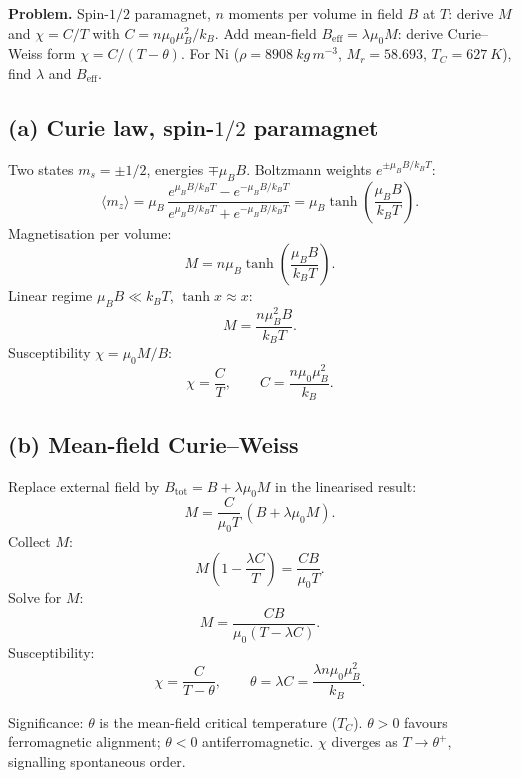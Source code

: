 \documentclass[11pt]{article}
\begin{document}
\textbf{Problem.} Spin-$1/2$ paramagnet, $n$ moments per volume in field $B$ at $T$: derive $M$ and $\chi=C/T$ with $C=n\mu_{0}\mu_{B}^{2}/k_{B}$. Add mean-field $B_\text{eff}=\lambda\mu_{0}M$: derive Curie--Weiss form $\chi=C/(T-\theta)$. For Ni ($\rho=\SI{8908}{kg\,m^{-3}}$, $M_r=58.693$, $T_C=\SI{627}{K}$), find $\lambda$ and $B_\text{eff}$.

\subsection*{(a) Curie law, spin-$1/2$ paramagnet}

Two states $m_{s}=\pm 1/2$, energies $\mp \mu_{B}B$. Boltzmann weights $e^{\pm\mu_{B}B/k_{B}T}$:
\[ \langle m_{z}\rangle = \mu_{B}\,\frac{e^{\mu_{B}B/k_{B}T}-e^{-\mu_{B}B/k_{B}T}}{e^{\mu_{B}B/k_{B}T}+e^{-\mu_{B}B/k_{B}T}} = \mu_{B}\tanh\!\left(\frac{\mu_{B}B}{k_{B}T}\right). \]
Magnetisation per volume:
\[ M = n\mu_{B}\tanh\!\left(\frac{\mu_{B}B}{k_{B}T}\right).\label{eq:Mfull} \]
Linear regime $\mu_{B}B\ll k_{B}T$, $\tanh x\approx x$:
\[ M = \frac{n\mu_{B}^{2}B}{k_{B}T}. \]
Susceptibility $\chi=\mu_{0}M/B$:
\[ \boxed{\;\chi = \frac{C}{T},\qquad C = \frac{n\mu_{0}\mu_{B}^{2}}{k_{B}}.\;}\label{eq:Curie} \]

\subsection*{(b) Mean-field Curie--Weiss}

Replace external field by $B_\text{tot}=B+\lambda\mu_{0}M$ in the linearised result:
\[ M = \frac{C}{\mu_{0}T}\,(B+\lambda\mu_{0}M). \]
Collect $M$:
\[ M\!\left(1-\frac{\lambda C}{T}\right) = \frac{C B}{\mu_{0}T}. \]
Solve for $M$:
\[ M = \frac{C B}{\mu_{0}(T-\lambda C)}. \]
Susceptibility:
\[ \boxed{\;\chi = \frac{C}{T-\theta},\qquad \theta = \lambda C = \frac{\lambda n \mu_{0}\mu_{B}^{2}}{k_{B}}.\;}\label{eq:CW} \]

Significance: $\theta$ is the mean-field critical temperature ($T_{C}$). $\theta>0$ favours ferromagnetic alignment; $\theta<0$ antiferromagnetic. $\chi$ diverges as $T\to\theta^{+}$, signalling spontaneous order.

\begin{center}
\end{center}
\end{document}
